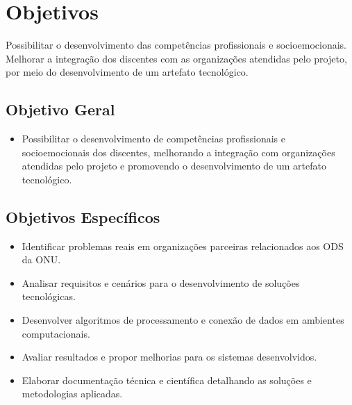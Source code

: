 \chapter{Objetivos}
\label{cap:objetivos}

Possibilitar o desenvolvimento das competências profissionais e socioemocionais. Melhorar a integração dos discentes com as organizações atendidas pelo projeto, por meio do desenvolvimento de um artefato tecnológico.

\section{Objetivo Geral}

\begin{itemize}
    \item Possibilitar o desenvolvimento de competências profissionais e socioemocionais dos discentes, melhorando a integração com organizações atendidas pelo projeto e promovendo o desenvolvimento de um artefato tecnológico.
\end{itemize}


\section{Objetivos Específicos}

\begin{itemize}
    \item Identificar problemas reais em organizações parceiras relacionados aos ODS da ONU.
    \item Analisar requisitos e cenários para o desenvolvimento de soluções tecnológicas.
    \item Desenvolver algoritmos de processamento e conexão de dados em ambientes computacionais.
    \item Avaliar resultados e propor melhorias para os sistemas desenvolvidos.
    \item Elaborar documentação técnica e científica detalhando as soluções e metodologias aplicadas.
\end{itemize}

